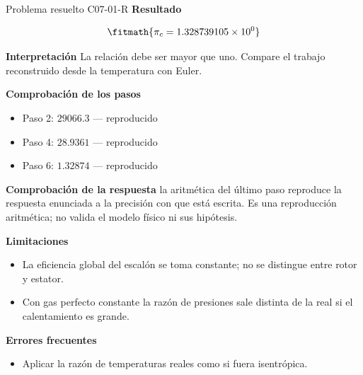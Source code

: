 \documentclass[10pt,openany]{book}
\begin{document}
\begin{studiumworked}{Problema resuelto C07-01-R}
\noindent\textbf{Resultado}

\[
\fitmath{\pi_c=1.328739105\times10^{0}}
\]

\noindent\textbf{Interpretación}
La relación debe ser mayor que uno. Compare el trabajo reconstruido desde la temperatura con Euler.

\noindent\textbf{Comprobación de los pasos}
\begin{itemize}
\item Paso 2: $29066.3$ — reproducido
\item Paso 4: $28.9361$ — reproducido
\item Paso 6: $1.32874$ — reproducido
\end{itemize}

\noindent\textbf{Comprobación de la respuesta} la aritmética del último paso reproduce la respuesta enunciada a la precisión con que está escrita. Es una reproducción aritmética; no valida el modelo físico ni sus hipótesis.

\noindent\textbf{Limitaciones}
\begin{itemize}
\item La eficiencia global del escalón se toma constante; no se distingue entre rotor y estator.
\item Con gas perfecto constante la razón de presiones sale distinta de la real si el calentamiento es grande.
\end{itemize}

\noindent\textbf{Errores frecuentes}
\begin{itemize}
\item Aplicar la razón de temperaturas reales como si fuera isentrópica.
\end{itemize}
\end{studiumworked}
\end{document}
